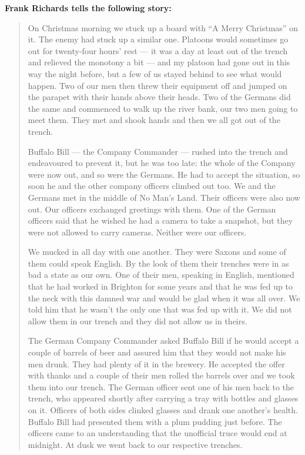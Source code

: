 \textbf{Frank Richards tells the following story:}


\begin{quote}
On Christmas morning we stuck up a board with “A Merry Christmas” on it. The enemy had stuck up a similar one. Platoons would sometimes go out for twenty-four hours’ rest — it was a day at least out of the trench and relieved the monotony a bit — and my platoon had gone out in this way the night before, but a few of us stayed behind to see what would happen. Two of our men then threw their equipment off and jumped on the parapet with their hands above their heads. Two of the Germans did the same and commenced to walk up the river bank, our two men going to meet them. They met and shook hands and then we all got out of the trench.

Buffalo Bill — the Company Commander — rushed into the trench and endeavoured to prevent it, but he was too late: the whole of the Company were now out, and so were the Germans. He had to accept the situation, so soon he and the other company officers climbed out too. We and the Germans met in the middle of No Man’s Land. Their officers were also now out. Our officers exchanged greetings with them. One of the German officers said that he wished he had a camera to take a snapshot, but they were not allowed to carry cameras. Neither were our officers.

We mucked in all day with one another. They were Saxons and some of them could speak English. By the look of them their trenches were in as bad a state as our own. One of their men, speaking in English, mentioned that he had worked in Brighton for some years and that he was fed up to the neck with this damned war and would be glad when it was all over. We told him that he wasn’t the only one that was fed up with it. We did not allow them in our trench and they did not allow us in theirs.

The German Company Commander asked Buffalo Bill if he would accept a couple of barrels of beer and assured him that they would not make his men drunk. They had plenty of it in the brewery. He accepted the offer with thanks and a couple of their men rolled the barrels over and we took them into our trench. The German officer sent one of his men back to the trench, who appeared shortly after carrying a tray with bottles and glasses on it. Officers of both sides clinked glasses and drank one another’s health. Buffalo Bill had presented them with a plum pudding just before. The officers came to an understanding that the unofficial truce would end at midnight. At dusk we went back to our respective trenches.


\end{quote}

